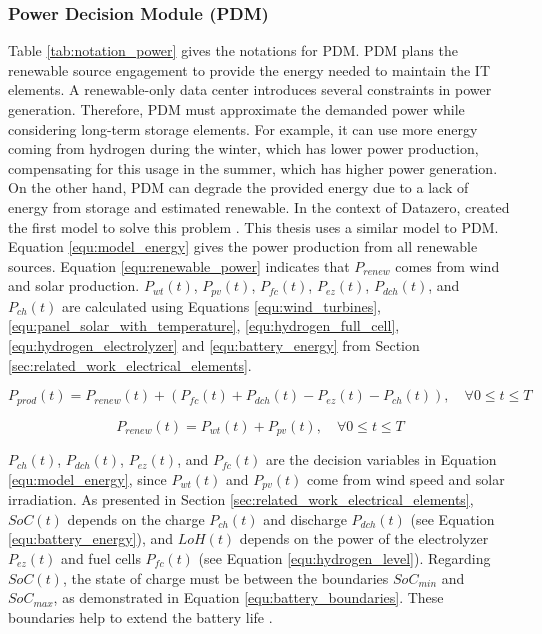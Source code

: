 \subsubsection{Power Decision Module (PDM)}
Table \ref{tab:notation_power} gives the notations for PDM. PDM plans the renewable source engagement to provide the energy needed to maintain the IT elements. A renewable-only data center introduces several constraints in power generation. Therefore, PDM must approximate the demanded power while considering long-term storage elements. For example, it can use more energy coming from hydrogen during the winter, which has lower power production, compensating for this usage in the summer, which has higher power generation. On the other hand, PDM can degrade the provided energy due to a lack of energy from storage and estimated renewable. In the context of Datazero, \citeauthor{haddad2019mixed} created the first model to solve this problem \cite{haddad2019mixed}. This thesis uses a similar model to PDM. Equation \ref{equ:model_energy} gives the power production from all renewable sources. Equation \ref{equ:renewable_power} indicates that $P_{renew}$ comes from wind and solar production. $P_{wt}(t)$, $P_{pv}(t)$, $P_{fc}(t)$, $P_{ez}(t)$, $P_{dch}(t)$, and $P_{ch}(t)$ are calculated using Equations \ref{equ:wind_turbines}, \ref{equ:panel_solar_with_temperature}, \ref{equ:hydrogen_full_cell}, \ref{equ:hydrogen_electrolyzer} and \ref{equ:battery_energy} from Section \ref{sec:related_work_electrical_elements}.



\begin{equation}
    \label{equ:model_energy}
    P_{prod}(t) = P_{renew}(t) + (P_{fc}(t) + P_{dch}(t) - P_{ez}(t) - P_{ch}(t)), \quad \forall 0 \le t \le T
\end{equation}

\begin{equation}
    \label{equ:renewable_power}
    P_{renew}(t) = P_{wt}(t) + P_{pv}(t), \quad \forall 0 \le t \le T
\end{equation}

$P_{ch}(t)$, $P_{dch}(t)$, $P_{ez}(t)$, and $P_{fc}(t)$ are the decision variables in Equation \ref{equ:model_energy}, since $P_{wt}(t)$ and $P_{pv}(t)$ come from wind speed and solar irradiation. As presented in Section \ref{sec:related_work_electrical_elements}, $SoC(t)$ depends on the charge $P_{ch}(t)$ and discharge $P_{dch}(t)$ (see Equation \ref{equ:battery_energy}), and $LoH(t)$ depends on the power of the electrolyzer $P_{ez}(t)$ and fuel cells $P_{fc}(t)$ (see Equation \ref{equ:hydrogen_level}). Regarding $SoC(t)$, the state of charge must be between the boundaries $SoC_{min}$ and $SoC_{max}$, as demonstrated in Equation \ref{equ:battery_boundaries}. These boundaries help to extend the battery life \cite{xu2016modeling}.


